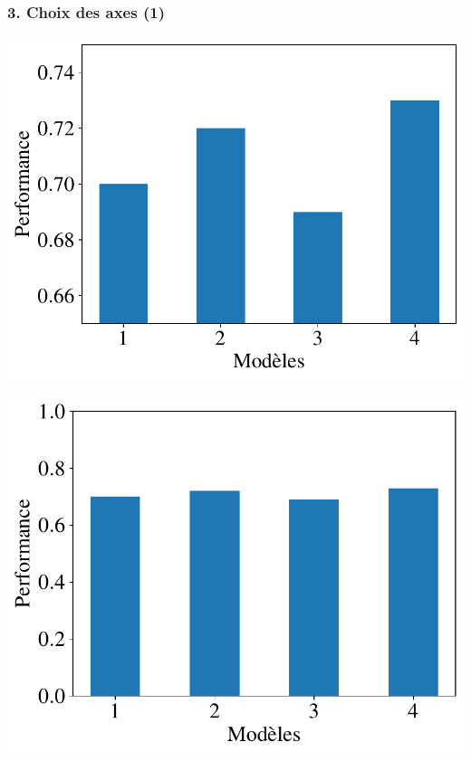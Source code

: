 \documentclass[sans,14pt]{beamer}
\begin{document}
{\begin{frame}
  \frametitle{3. Choix des axes (1)}
  \begin{minipage}[h]{0.49\linewidth}
    \begin{center}
      \includegraphics[width=\textwidth]{../poly/figures/pratiques/bars_start_nonzero}
    \end{center}
  \end{minipage}%
  \pause
  \hfill
  \begin{minipage}[h]{0.49\linewidth}
    \begin{center}
      \includegraphics[width=\textwidth]{../poly/figures/pratiques/bars_start_zero}
    \end{center}
  \end{minipage}%
\end{frame}

}
\end{document}

